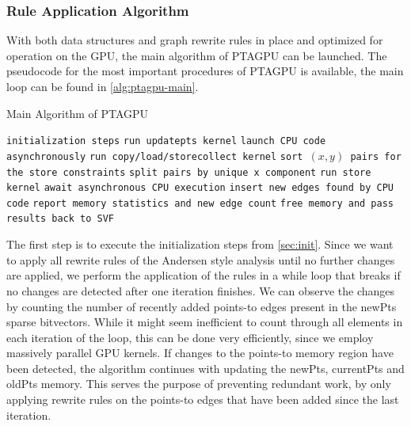 \subsubsection{Rule Application Algorithm}\label{sec:main-algo}
With both data structures and graph rewrite rules in place and optimized for operation on the GPU, the main algorithm of PTAGPU can be launched.
The pseudocode for the most important procedures of PTAGPU is available, the main loop can be found in \autoref{alg:ptagpu-main}.
\begin{algorithm}
    \caption{Main Algorithm of PTAGPU}\label{alg:ptagpu-main}
    \begin{algorithmic}
        \State \texttt{initialization steps}
        \State \texttt{run updatepts kernel} 
        \State \texttt{launch CPU code asynchronously} 
        \State \texttt{run copy/load/storecollect kernel} 
        \State \texttt{sort $(x,y)$ pairs for the store constraints}
        \State \texttt{split pairs by unique x component}
        \State \texttt{run store kernel} 
        \State \texttt{await asynchronous CPU execution}
        \State \texttt{insert new edges found by CPU code}
        \State \texttt{report memory statistics and new edge count} 
        \EndWhile
        \State \texttt{free memory and pass results back to SVF}
    \end{algorithmic}
\end{algorithm}
The first step is to execute the initialization steps from \autoref{sec:init}.
Since we want to apply all rewrite rules of the Andersen style analysis until no further changes are applied, we perform the application of the rules in a while loop that breaks if no changes are detected after one iteration finishes.
We can observe the changes by counting the number of recently added points-to edges present in the newPts sparse bitvectors.
While it might seem inefficient to count through all elements in each iteration of the loop, this can be done very efficiently, since we employ massively parallel GPU kernels.
If changes to the points-to memory region have been detected, the algorithm continues with updating the newPts, currentPts and oldPts memory.
This serves the purpose of preventing redundant work, by only applying rewrite rules on the points-to edges that have been added since the last iteration.
